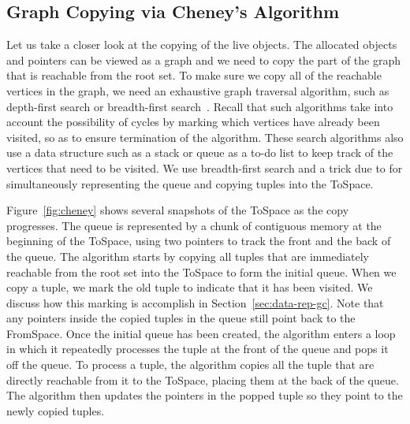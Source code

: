 \documentclass[11pt]{book}
\begin{document}
\subsection{Graph Copying via Cheney's Algorithm}
\label{sec:cheney}
Let us take a closer look at the copying of the live objects. The
allocated objects and pointers can be viewed as a graph and we need to
copy the part of the graph that is reachable from the root set. To
make sure we copy all of the reachable vertices in the graph, we need
an exhaustive graph traversal algorithm, such as depth-first search or
breadth-first search~\citep{Moore:1959aa,Cormen:2001uq}. Recall that
such algorithms take into account the possibility of cycles by marking
which vertices have already been visited, so as to ensure termination
of the algorithm. These search algorithms also use a data structure
such as a stack or queue as a to-do list to keep track of the vertices
that need to be visited. We use breadth-first search and a trick
due to \citet{Cheney:1970aa} for simultaneously representing the queue
and copying tuples into the ToSpace.

Figure~\ref{fig:cheney} shows several snapshots of the ToSpace as the
copy progresses. The queue is represented by a chunk of contiguous
memory at the beginning of the ToSpace, using two pointers to track
the front and the back of the queue. The algorithm starts by copying
all tuples that are immediately reachable from the root set into the
ToSpace to form the initial queue.  When we copy a tuple, we mark the
old tuple to indicate that it has been visited. We discuss how this
marking is accomplish in Section~\ref{sec:data-rep-gc}. Note that any
pointers inside the copied tuples in the queue still point back to the
FromSpace. Once the initial queue has been created, the algorithm
enters a loop in which it repeatedly processes the tuple at the front
of the queue and pops it off the queue.  To process a tuple, the
algorithm copies all the tuple that are directly reachable from it to
the ToSpace, placing them at the back of the queue. The algorithm then
updates the pointers in the popped tuple so they point to the newly
copied tuples.
\end{document}
